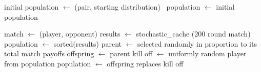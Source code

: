 \documentclass{article}
\begin{document}
  \begin{algorithmic}[1]
  \STATE initial population $\gets$ (pair, starting distribution) \
  \STATE population $\gets$ initial population

        \STATE match $\gets$ (player, opponent) 
        \STATE results $\gets$ stochastic\_cache (200 round match)
        \ENDFOR
      \ENDFOR
      \STATE population $\gets$ sorted(results)
      \STATE parent $\gets$ selected randomly in proportion to its total match payoffs
      \STATE offspring $\gets$ parent
      \STATE kill off $\gets$ uniformly random player from population
      \STATE population $\gets$ offspring replaces kill off
    \ENDWHILE
  \end{algorithmic}
\end{document}
